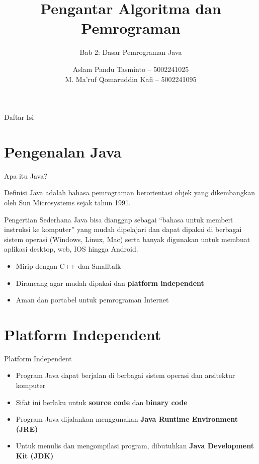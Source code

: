 \documentclass{beamer}
\title{Pengantar Algoritma dan Pemrograman}
\subtitle{Bab 2: Dasar Pemrograman Java}
\author{Aslam Pandu Tasminto -- 5002241025 \\ M. Ma'ruf Qomaruddin Kafi -- 5002241095}
\institute{Departemen Matematika \\ Fakultas Sains dan Analitika Data \\ Institut Teknologi Sepuluh Nopember}
\begin{document}
\maketitle

\begin{frame}{Daftar Isi}
  \tableofcontents
\end{frame}

\section{Pengenalan Java}
\begin{frame}{Apa itu Java?}
  \begin{block}{Definisi}
    Java adalah bahasa pemrograman berorientasi objek yang dikembangkan oleh Sun Microsystems sejak tahun 1991.
  \end{block}
  \begin{block}{Pengertian Sederhana}
    Java bisa dianggap sebagai “bahasa untuk memberi instruksi ke komputer” yang mudah dipelajari dan dapat dipakai di berbagai sistem operasi (Windows, Linux, Mac) serta banyak digunakan untuk membuat aplikasi desktop, web, IOS hingga Android.
      \begin{itemize}
        \item Mirip dengan C++ dan Smalltalk
        \item Dirancang agar mudah dipakai dan \textbf{platform independent}
        \item Aman dan portabel untuk pemrograman Internet
      \end{itemize}
  \end{block}
\end{frame}


\section{Platform Independent}
\begin{frame}{Platform Independent}
  \begin{itemize}
    \item Program Java dapat berjalan di berbagai sistem operasi dan arsitektur komputer
    \item Sifat ini berlaku untuk \textbf{source code} dan \textbf{binary code}
    \item Program Java dijalankan menggunakan \textbf{Java Runtime Environment (JRE)}
    \item Untuk menulis dan mengompilasi program, dibutuhkan \textbf{Java Development Kit (JDK)}
  \end{itemize}
  \begin{center}
  \end{center}
\end{frame}
\end{document}
